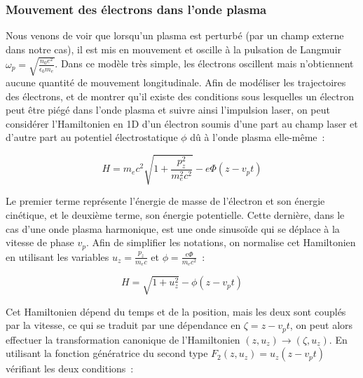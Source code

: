 \documentclass[a4paper]{book}
\begin{document}
\medskip

\noindent{}\hfill
    
\medskip

\subsubsection{Mouvement des électrons dans l'onde plasma}
Nous venons de voir que lorsqu'un plasma est perturbé (par un champ externe dans notre cas), il est mis en mouvement et oscille à la pulsation de Langmuir $\omega_p = \sqrt{\frac{n_0 e^2}{\epsilon_0 m_e}}$. Dans ce modèle très simple, les électrons oscillent mais n'obtiennent aucune quantité de mouvement longitudinale. Afin de modéliser les trajectoires des électrons, et de montrer qu'il existe des conditions sous lesquelles un électron peut être piégé dans l'onde plasma et suivre ainsi l'impulsion laser, on peut considérer l'Hamiltonien en 1D d'un électron soumis d'une part au champ laser et d'autre part au potentiel électrostatique $\phi$ dû à l'onde plasma elle-même~: 

\begin{equation*}
    H=m_ec^2\sqrt{1+\frac{p_z^2}{m_e^2c^2}}-e\Phi(z-v_pt)
\end{equation*}

Le premier terme représente l'énergie de masse de l'électron et son énergie cinétique, et le deuxième terme, son énergie potentielle. Cette dernière, dans le cas d'une onde plasma harmonique, est une onde sinusoïde qui se déplace à la vitesse de phase $v_p$. Afin de simplifier les notations, on normalise cet Hamiltonien en utilisant les variables $u_z=\frac{p_z}{m_ec}$ et $\phi = \frac{e\Phi}{m_ec^2}$~:

\begin{equation}
    H=\sqrt{1+u_z^2}-\phi(z-v_pt)
\end{equation}

Cet Hamiltonien dépend du temps et de la position, mais les deux sont couplés par la vitesse, ce qui se traduit par une dépendance en $\zeta = z-v_pt$, on peut alors effectuer la transformation canonique de l'Hamiltonien $(z, u_z)\rightarrow(\zeta, u_z)$. En utilisant la fonction génératrice du second type $F_2(z, u_z)=u_z(z-v_pt)$ vérifiant les deux conditions~:
\end{document}
